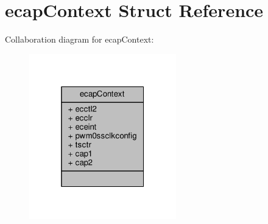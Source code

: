 \hypertarget{structecap_context}{}\section{ecap\+Context Struct Reference}
\label{structecap_context}


Collaboration diagram for ecap\+Context\+:\nopagebreak
\begin{figure}[H]
\begin{center}
\leavevmode
\includegraphics[width=181pt]{structecap_context__coll__graph}
\end{center}
\end{figure}

